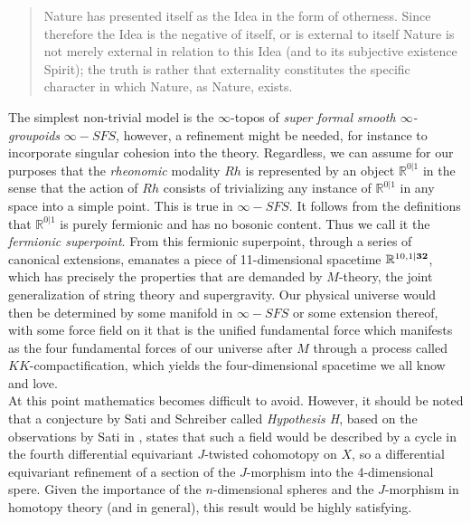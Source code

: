 \documentclass{article}
\begin{document}
\begin{quote}
    Nature has presented itself as the Idea in the form of otherness. Since therefore the Idea is the
negative of itself, or is external to itself Nature is not merely external in relation to this Idea (and
to its subjective existence Spirit); the truth is rather that externality constitutes the specific character
in which Nature, as Nature, exists.
\end{quote}

The simplest non-trivial model is the $\infty$-topos of \emph{super formal smooth $\infty$-groupoids}
$\infty-SFS$, however, a refinement might be needed, for instance to incorporate singular cohesion into
the theory. Regardless, we can assume for our purposes that the \emph{rheonomic} modality $Rh$ is represented
by an object $\mathbb{R}^{0|1}$ in the sense that the action of $Rh$ consists of trivializing any instance
of  $\mathbb{R}^{0|1}$ in any space into a simple point. This is true in $\infty-SFS$. It follows from
the definitions that $\mathbb{R}^{0|1}$ is purely fermionic and has no bosonic content. Thus we call it
the \emph{fermionic superpoint}. From this fermionic superpoint, through a series of canonical extensions,
emanates a piece of 11-dimensional spacetime $\mathbb{R}^{10,1|\textrm{\textbf{32}}}$, which has precisely
the properties that are demanded by $M$-theory, the joint generalization of string theory and supergravity.
Our physical universe would then be determined by some manifold in $\infty-SFS$ or some extension thereof,
with some force field on it that is the unified fundamental force which manifests as the four fundamental
forces of our universe after $M$ through a process called $KK$-compactification, which yields the four-dimensional
spacetime we all know and love. \\

At this point mathematics becomes difficult to avoid. However, it should be noted that a conjecture by Sati and Schreiber called \emph{Hypothesis H}, based on the observations by Sati in \cite{Sati}, states that such a field would be described by a cycle in the fourth
differential equivariant $J$-twisted cohomotopy on $X$, so a differential equivariant refinement of a section
of the $J$-morphism into the 4-dimensional spere. Given the importance of the $n$-dimensional spheres and the
$J$-morphism in homotopy theory (and in general),
this result would be highly satisfying.
\end{document}
